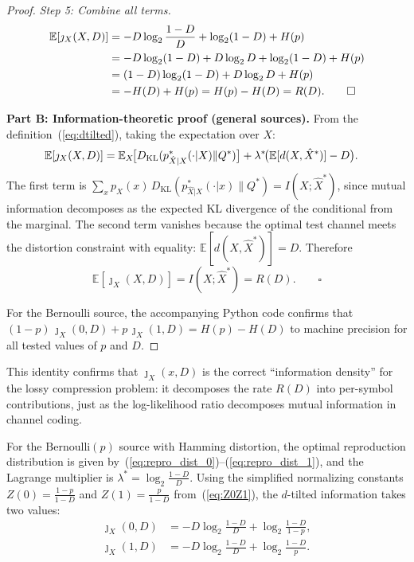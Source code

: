 \documentclass[11pt]{article}
\newcommand{\RD}{R(D)}
\newcommand{\Hp}{H(p)}
\newcommand{\HD}{H(D)}
\newcommand{\Ber}{\mathrm{Bernoulli}}
\newcommand{\E}{\mathbb{E}}
\begin{document}
\begin{proof}
\smallskip
\noindent\emph{Step 5: Combine all terms.}
\begin{align}
\E[\jmath_X(X,D)]
&= -D\log_2\frac{1-D}{D} + \log_2(1-D) + H(p) \notag\\
&= -D\log_2(1-D) + D\log_2 D + \log_2(1-D) + H(p) \notag\\
&= (1-D)\log_2(1-D) + D\log_2 D + H(p) \notag\\
&= -H(D) + H(p) = H(p) - H(D) = \RD. \qquad\square \notag
\end{align}

\smallskip
\noindent\textbf{Part B: Information-theoretic proof (general sources).}
From the definition~(\ref{eq:dtilted}), taking the expectation over $X$:
\begin{align}
\E[\jmath_X(X,D)]
&= \E_X\!\bigl[D_{\mathrm{KL}}(p^*_{\hat{X}|X}(\cdot|X) \| Q^*)\bigr]
   + \lambda^*\!\bigl(\E[d(X,\hat{X}^*)] - D\bigr). \notag
\end{align}
The first term is $\sum_x p_X(x)\,D_{\mathrm{KL}}(p^*_{\hat{X}|X}(\cdot|x) \| Q^*)
= I(X;\hat{X}^*)$, since mutual information decomposes as the expected
KL divergence of the conditional from the marginal.
The second term vanishes because the optimal test channel meets the distortion
constraint with equality: $\E[d(X,\hat{X}^*)] = D$.
Therefore
\[
\E[\jmath_X(X,D)] = I(X;\hat{X}^*) = \RD. \qquad\square
\]

For the Bernoulli source, the accompanying Python code confirms that
$(1-p)\,\jmath_X(0,D) + p\,\jmath_X(1,D) = \Hp - \HD$
to machine precision for all tested values of $p$ and $D$.
\end{proof}

This identity confirms that $\jmath_X(x, D)$ is the correct ``information density''
for the lossy compression problem: it decomposes the rate $\RD$ into per-symbol
contributions, just as the log-likelihood ratio decomposes mutual information
in channel coding.

For the $\Ber(p)$ source with Hamming distortion, the optimal reproduction
distribution is given
by~(\ref{eq:repro_dist_0})--(\ref{eq:repro_dist_1}), and the Lagrange
multiplier is $\lambda^* = \log_2\frac{1-D}{D}$.
Using the simplified normalizing constants $Z(0) = \frac{1-p}{1-D}$
and $Z(1) = \frac{p}{1-D}$ from~(\ref{eq:Z0Z1}), the $d$-tilted information
takes two values:
\begin{align}
\jmath_X(0, D) &= -D\log_2\frac{1-D}{D} + \log_2\frac{1-D}{1-p}, \label{eq:jx0}\\
\jmath_X(1, D) &= -D\log_2\frac{1-D}{D} + \log_2\frac{1-D}{p}. \label{eq:jx1}
\end{align}
\end{document}
